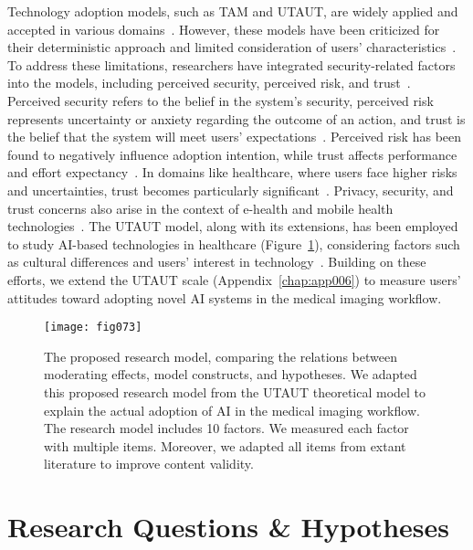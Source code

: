 
Technology adoption models, such as \ac{TAM} and \ac{UTAUT}, are widely applied and accepted in various domains~\cite{KHALILZADEH2017460}.
However, these models have been criticized for their deterministic approach and limited consideration of users' characteristics~\cite{CALISTO2022102922}.
To address these limitations, researchers have integrated security-related factors into the models, including perceived security, perceived risk, and trust~\cite{KHALILZADEH2017460}.
Perceived security refers to the belief in the system's security, perceived risk represents uncertainty or anxiety regarding the outcome of an action, and trust is the belief that the system will meet users' expectations~\cite{KHALILZADEH2017460}.
Perceived risk has been found to negatively influence adoption intention, while trust affects performance and effort expectancy~\cite{Lee:2013:0301-2212:587}.
In domains like healthcare, where users face higher risks and uncertainties, trust becomes particularly significant~\cite{CALISTO2022102922}.
Privacy, security, and trust concerns also arise in the context of e-health and mobile health technologies~\cite{10.1145/3132272.3134111}.
The \ac{UTAUT} model, along with its extensions, has been employed to study \ac{AI}-based technologies in healthcare \textcolor{revised}{(Figure~\ref{fig:fig073})}, considering factors such as cultural differences and users' interest in technology~\cite{SOHN2020101324, CALISTO2022102922}.
Building on these efforts, we extend the \ac{UTAUT} scale (Appendix~\ref{chap:app006}) to measure users' attitudes toward adopting novel \ac{AI} systems in the medical imaging workflow.

\begin{figure}[htbp]
\centering
\texttt{[image: fig073]}
\caption{\textcolor{revised}{The proposed research model, comparing the relations between moderating effects, model constructs, and hypotheses. We adapted this proposed research model from the UTAUT theoretical model to explain the actual adoption of AI in the medical imaging workflow. The research model includes 10 factors. We measured each factor with multiple items. Moreover, we adapted all items from extant literature to improve content validity.}}
\label{fig:fig073}
\end{figure}

\section{Research Questions \& Hypotheses}
\label{sec:chap004003}

